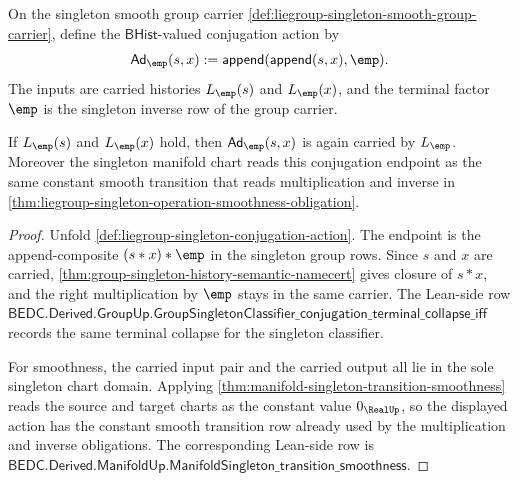 \begin{definition}
\label{def:liegroup-singleton-conjugation-action}
On the singleton smooth group carrier
\autoref{def:liegroup-singleton-smooth-group-carrier}, define the
$\mathsf{BHist}$-valued conjugation action by
$$
\mathsf{Ad}_{\emp}(s,x):=
\mathsf{append}(\mathsf{append}(s,x),\emp).
$$
The inputs are carried histories $L_{\emp}(s)$ and $L_{\emp}(x)$, and the
terminal factor $\emp$ is the singleton inverse row of the group carrier.
\end{definition}

\begin{theorem}
\label{thm:liegroup-singleton-conjugation-carrier-and-smoothness}
If $L_{\emp}(s)$ and $L_{\emp}(x)$ hold, then
$\mathsf{Ad}_{\emp}(s,x)$ is again carried by $L_{\emp}$. Moreover the singleton
manifold chart reads this conjugation endpoint as the same constant smooth
transition that reads multiplication and inverse in
\autoref{thm:liegroup-singleton-operation-smoothness-obligation}.
\end{theorem}
\begin{proof}
Unfold \autoref{def:liegroup-singleton-conjugation-action}. The endpoint is the
append-composite $(s*x)*\emp$ in the singleton group rows. Since $s$ and $x$ are
carried, \autoref{thm:group-singleton-history-semantic-namecert} gives closure
of $s*x$, and the right multiplication by $\emp$ stays in the same carrier. The
Lean-side row
$\mathsf{BEDC.Derived.GroupUp.GroupSingletonClassifier\_conjugation\_terminal\_collapse\_iff}$
records the same terminal collapse for the singleton classifier.

For smoothness, the carried input pair and the carried output all lie in the
sole singleton chart domain. Applying
\autoref{thm:manifold-singleton-transition-smoothness} reads the source and
target charts as the constant value $0_{\RealUp}$, so the displayed action has
the constant smooth transition row already used by the multiplication and
inverse obligations. The corresponding Lean-side row is
$\mathsf{BEDC.Derived.ManifoldUp.ManifoldSingleton\_transition\_smoothness}$.
\end{proof}

